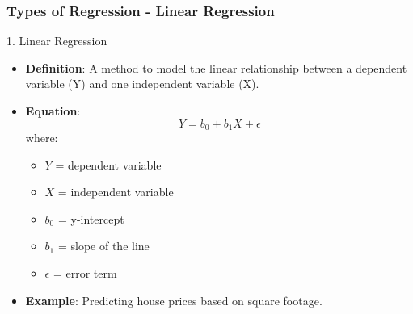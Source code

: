 \documentclass{beamer}
\begin{document}
\begin{frame}[fragile]
    \frametitle{Types of Regression - Linear Regression}
    \begin{block}{1. Linear Regression}
        \begin{itemize}
            \item \textbf{Definition}: A method to model the linear relationship between a dependent variable (Y) and one independent variable (X).
            \item \textbf{Equation}:
            \begin{equation}
            Y = b_0 + b_1X + \epsilon
            \end{equation}
            where:
            \begin{itemize}
                \item $Y$ = dependent variable
                \item $X$ = independent variable
                \item $b_0$ = y-intercept
                \item $b_1$ = slope of the line
                \item $\epsilon$ = error term
            \end{itemize}
            \item \textbf{Example}: Predicting house prices based on square footage.
        \end{itemize}
    \end{block}
\end{frame}
\end{document}
